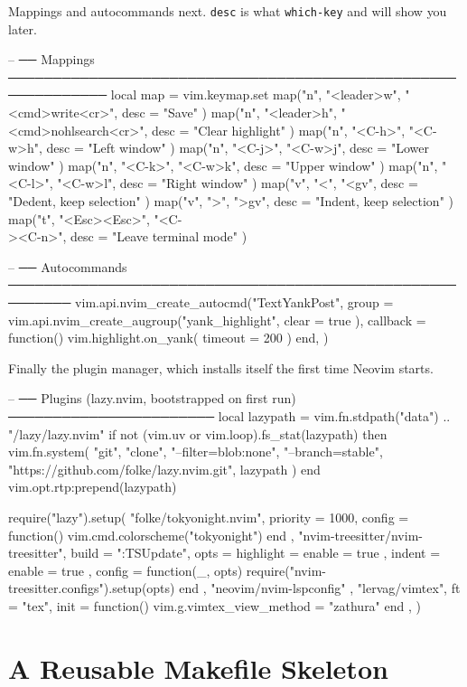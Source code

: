 Mappings and autocommands next. \texttt{desc} is what \texttt{which-key} and
 will show you later.

\begin{luacode}
-- ── Mappings ─────────────────────────────────────────────────────────────
local map = vim.keymap.set
map("n", "<leader>w", "<cmd>write<cr>", { desc = "Save" })
map("n", "<leader>h", "<cmd>nohlsearch<cr>", { desc = "Clear highlight" })
map("n", "<C-h>", "<C-w>h", { desc = "Left window" })
map("n", "<C-j>", "<C-w>j", { desc = "Lower window" })
map("n", "<C-k>", "<C-w>k", { desc = "Upper window" })
map("n", "<C-l>", "<C-w>l", { desc = "Right window" })
map("v", "<", "<gv", { desc = "Dedent, keep selection" })
map("v", ">", ">gv", { desc = "Indent, keep selection" })
map("t", "<Esc><Esc>", "<C-\\><C-n>", { desc = "Leave terminal mode" })

-- ── Autocommands ─────────────────────────────────────────────────────────
vim.api.nvim_create_autocmd("TextYankPost", {
  group = vim.api.nvim_create_augroup("yank_highlight", { clear = true }),
  callback = function() vim.highlight.on_yank({ timeout = 200 }) end,
})

\end{luacode}

Finally the plugin manager, which installs itself the first time Neovim starts.

\begin{luacode}
-- ── Plugins (lazy.nvim, bootstrapped on first run) ───────────────────────
local lazypath = vim.fn.stdpath("data") .. "/lazy/lazy.nvim"
if not (vim.uv or vim.loop).fs_stat(lazypath) then
  vim.fn.system({ "git", "clone", "--filter=blob:none", "--branch=stable",
    "https://github.com/folke/lazy.nvim.git", lazypath })
end
vim.opt.rtp:prepend(lazypath)

require("lazy").setup({
  { "folke/tokyonight.nvim", priority = 1000,
    config = function() vim.cmd.colorscheme("tokyonight") end },
  { "nvim-treesitter/nvim-treesitter", build = ":TSUpdate",
    opts = { highlight = { enable = true }, indent = { enable = true } },
    config = function(_, opts)
      require("nvim-treesitter.configs").setup(opts)
    end },
  { "neovim/nvim-lspconfig" },
  { "lervag/vimtex", ft = "tex", init = function()
      vim.g.vimtex_view_method = "zathura"
    end },
})
\end{luacode}

\section{A Reusable Makefile Skeleton}\label{app:config-makefile}

